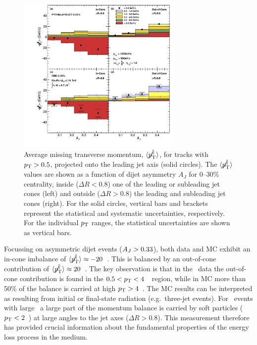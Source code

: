 \begin{figure}[!h]
\begin{center}
\includegraphics[width=0.7\textwidth]{jetfigures/missingPtParallel-Corrected-data-InConeOutConeDPhiCut_ntv6_2.pdf}
\caption{Average missing transverse momentum,
$\langle \displaystyle{\not} p_{\mathrm{T}}^{\parallel} \rangle$,
for tracks with $\mbox{$p_{\mathrm{T}}$} > 0.5$\GeVc, projected onto the leading jet axis (solid circles).
The $\langle \displaystyle{\not} p_{\mathrm{T}}^{\parallel} \rangle$ values are 
shown as a function of dijet asymmetry
$A_J$ for 0--30\% centrality, inside ($\Delta R < 0.8$) one of the leading or subleading jet cones (left) and
outside ($\Delta R > 0.8$) the leading and subleading jet cones (right).
For the solid circles, vertical bars and brackets represent
the statistical and systematic uncertainties, respectively.
For the individual $\mbox{$p_{\mathrm{T}}$}$ ranges, the statistical uncertainties are shown as vertical bars. }
\label{fig:GR:CMS_missingpT}
\end{center}
\end{figure}

Focussing on asymmetric dijet events ($A_J > 0.33$), both data and MC exhibit an
 in-cone imbalance of $\langle \displaystyle{\not} p_{\mathrm{T}}^{\parallel} \rangle \approx
-20$~\GeVc. This is balanced by an out-of-cone contribution of
$\langle \displaystyle{\not} p_{\mathrm{T}}^{\parallel} \rangle \approx 20$~\GeVc. The key 
observation is that in the \PbPb\ data the out-of-cone contribution is found in the $0.5 < \mbox{$p_{\mathrm{T}}$} < 4$~\GeVc\ region, 
while in MC more than 50\% of the balance is carried at high $\mbox{$p_{\mathrm{T}}$} > 4$~\GeVc. The MC 
results can be interpreted as resulting from initial or final-state radiation (e.g.\ three-jet events).
For \PbPb\ events with large \AJ\ a large part of the momentum balance is 
carried by soft particles ($\mbox{$p_{\mathrm{T}}$} < 2$~\GeVc) at large angles to the jet axes ($\Delta R > 0.8$). This measurement
therefore has provided crucial information about the fundamental properties of the energy loss process 
in the medium.

